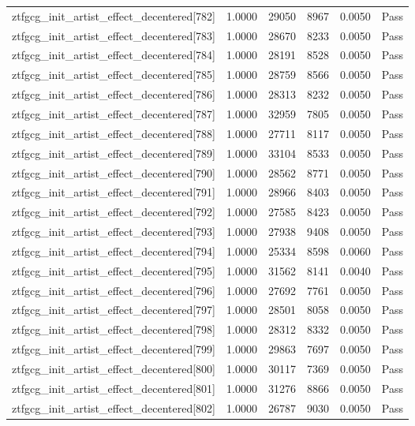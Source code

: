 \begin{table}[htbp]
\begin{tabular}{llrrll}
ztfgcg\_init\_artist\_effect\_decentered[782] & 1.0000 & 29050 & 8967 & 0.0050 & Pass \\
ztfgcg\_init\_artist\_effect\_decentered[783] & 1.0000 & 28670 & 8233 & 0.0050 & Pass \\
ztfgcg\_init\_artist\_effect\_decentered[784] & 1.0000 & 28191 & 8528 & 0.0050 & Pass \\
ztfgcg\_init\_artist\_effect\_decentered[785] & 1.0000 & 28759 & 8566 & 0.0050 & Pass \\
ztfgcg\_init\_artist\_effect\_decentered[786] & 1.0000 & 28313 & 8232 & 0.0050 & Pass \\
ztfgcg\_init\_artist\_effect\_decentered[787] & 1.0000 & 32959 & 7805 & 0.0050 & Pass \\
ztfgcg\_init\_artist\_effect\_decentered[788] & 1.0000 & 27711 & 8117 & 0.0050 & Pass \\
ztfgcg\_init\_artist\_effect\_decentered[789] & 1.0000 & 33104 & 8533 & 0.0050 & Pass \\
ztfgcg\_init\_artist\_effect\_decentered[790] & 1.0000 & 28562 & 8771 & 0.0050 & Pass \\
ztfgcg\_init\_artist\_effect\_decentered[791] & 1.0000 & 28966 & 8403 & 0.0050 & Pass \\
ztfgcg\_init\_artist\_effect\_decentered[792] & 1.0000 & 27585 & 8423 & 0.0050 & Pass \\
ztfgcg\_init\_artist\_effect\_decentered[793] & 1.0000 & 27938 & 9408 & 0.0050 & Pass \\
ztfgcg\_init\_artist\_effect\_decentered[794] & 1.0000 & 25334 & 8598 & 0.0060 & Pass \\
ztfgcg\_init\_artist\_effect\_decentered[795] & 1.0000 & 31562 & 8141 & 0.0040 & Pass \\
ztfgcg\_init\_artist\_effect\_decentered[796] & 1.0000 & 27692 & 7761 & 0.0050 & Pass \\
ztfgcg\_init\_artist\_effect\_decentered[797] & 1.0000 & 28501 & 8058 & 0.0050 & Pass \\
ztfgcg\_init\_artist\_effect\_decentered[798] & 1.0000 & 28312 & 8332 & 0.0050 & Pass \\
ztfgcg\_init\_artist\_effect\_decentered[799] & 1.0000 & 29863 & 7697 & 0.0050 & Pass \\
ztfgcg\_init\_artist\_effect\_decentered[800] & 1.0000 & 30117 & 7369 & 0.0050 & Pass \\
ztfgcg\_init\_artist\_effect\_decentered[801] & 1.0000 & 31276 & 8866 & 0.0050 & Pass \\
ztfgcg\_init\_artist\_effect\_decentered[802] & 1.0000 & 26787 & 9030 & 0.0050 & Pass \\

\end{tabular}
\end{table}
